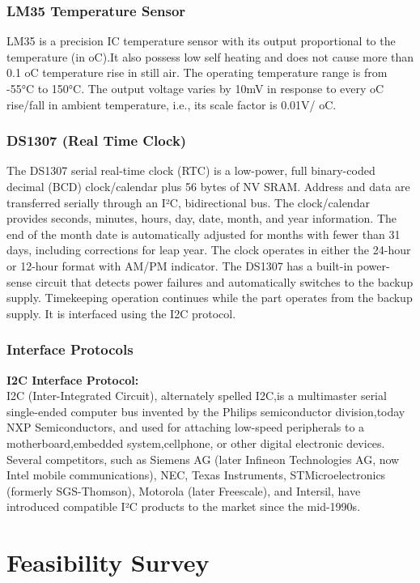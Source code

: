 \documentclass[12pt,a4paper,oneside]{report}
\begin{document}
\begin{onehalfspacing}
\subsection{LM35 Temperature Sensor}
LM35 is a precision IC temperature sensor with its output proportional to the temperature (in oC).It also possess low self heating and does not cause more than 0.1 oC temperature rise in still air. The operating temperature range is from -55°C to 150°C. The output voltage varies by 10mV in response to every oC rise/fall in ambient temperature, i.e., its scale factor is 0.01V/ oC.

\subsection{DS1307 (Real Time Clock)}
The DS1307 serial real-time clock (RTC) is a low-power, full binary-coded decimal (BCD) clock/calendar plus 56 bytes of NV SRAM. Address and data are transferred serially through an I²C, bidirectional bus. The clock/calendar provides seconds, minutes, hours, day, date, month, and year information. The end of the month date is automatically adjusted for months with fewer than 31 days, including corrections for leap year. The clock operates in either the 24-hour or 12-hour format with AM/PM indicator. The DS1307 has a built-in power-sense circuit that detects power failures and automatically switches to the backup supply. Timekeeping operation continues while the part operates from the backup supply. It is interfaced using the I2C protocol.\\

\subsection{Interface Protocols}
\textbf{I2C Interface Protocol:}\\
I2C (Inter-Integrated Circuit), alternately spelled I2C,is a multimaster serial single-ended computer bus invented by the Philips semiconductor division,today NXP Semiconductors, and used for attaching low-speed peripherals to a motherboard,embedded system,cellphone, or other digital electronic devices. Several competitors, such as Siemens AG (later Infineon Technologies AG, now Intel mobile communications), NEC, Texas Instruments, STMicroelectronics (formerly SGS-Thomson), Motorola (later Freescale), and Intersil, have introduced compatible I²C products to the market since the mid-1990s.

\chapter{Feasibility Survey}
{$\;\;\;\;$}

\end{onehalfspacing}
\end{document}
